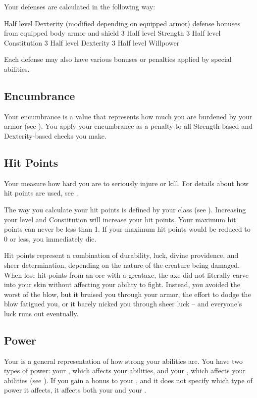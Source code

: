     Your defenses are calculated in the following way:
    \begin{itemize}
       Half level \add Dexterity (modified depending on equipped armor) \add defense bonuses from equipped body armor and shield
       3 \add Half level \add Strength
       3 \add Half level \add Constitution
       3 \add Half level \add Dexterity
       3 \add Half level \add Willpower
    \end{itemize}
    Each defense may also have various bonuses or penalties applied by special abilities.

  \subsection{Encumbrance}\label{Encumbrance}
    Your encumbrance is a value that represents how much you are burdened by your armor (see ).
    You apply your encumbrance as a penalty to all Strength-based and Dexterity-based checks you make.

  \subsection{Hit Points}\label{Hit Points}
    Your  measure how hard you are to seriously injure or kill.
    For details about how hit points are used, see .

    The way you calculate your hit points is defined by your class (see ).
    Increasing your level and Constitution will increase your hit points.
    Your maximum hit points can never be less than 1.
    If your maximum hit points would be reduced to 0 or less, you immediately die.

     Hit points represent a combination of durability, luck, divine providence, and sheer determination, depending on the nature of the creature being damaged.
    When lose hit points from an orc with a greataxe, the axe did not literally carve into your skin without affecting your ability to fight.
    Instead, you avoided the worst of the blow, but it bruised you through your armor, the effort to dodge the blow fatigued you, or it barely nicked you through sheer luck -- and everyone's luck runs out eventually.

  \subsection{Power}\label{Power}
    Your  is a general representation of how strong your abilities are.
    You have two types of power: your , which affects your \magical abilities, and your , which affects your  abilities (see ).
    If you gain a bonus to your , and it does not specify which type of power it affects, it affects both your  and your .

